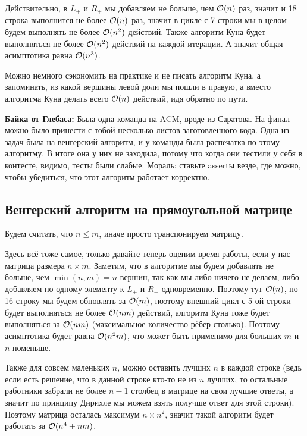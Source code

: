 \documentclass[a4paper, 12pt]{article}
\begin{document}
Действительно, в $L_+$ и $R_+$ мы добавляем не больше, чем $\mathcal{O}(n)$ раз, значит
и 18 строка выполнится не более $\mathcal{O}(n)$ раз, значит в цикле с 7 строки мы
в целом будем выполнять не более $\mathcal{O}(n^2)$ действий. Также
алгоритм Куна будет выполняться не более $\mathcal{O}(n^2)$ действий на каждой итерации.
А значит общая асимптотика равна $\mathcal{O}(n^3)$.

Можно немного сэкономить на практике
и не писать алгоритм Куна, а запоминать, из какой
вершины левой доли мы пошли в правую, а вместо алгоритма Куна делать всего
$\mathcal{O}(n)$ действий, идя обратно по пути.

{\bf Байка от Глебаса:} Была одна команда на ACM, вроде из Саратова. На финал
можно было принести с тобой несколько листов заготовленного кода.
Одна из задач была на венгерский алгоритм, и у команды была распечатка по этому алгоритму.
В итоге она у них не заходила, потому что когда они тестили у себя в контесте,
видимо, тесты были слабые. Мораль: ставьте assertы везде, где можно, чтобы
убедиться, что этот алгоритм работает корректно.

\subsection{Венгерский алгоритм на прямоугольной матрице}

Будем считать, что $n \leqslant m$, иначе просто транспонируем матрицу.

Здесь всё тоже самое, только давайте теперь оценим время работы, если у нас
матрица размера $n \times m$. Заметим, что в алгоритме мы будем добавлять не больше,
чем $\min(n, m) = n$ вершин, так как мы либо ничего не делаем, либо добавляем по
одному элементу к $L_+$ и $R_+$ одновременно. Поэтому тут $\mathcal{O}(n)$, но 16 строку
мы будем обновлять за $\mathcal{O}(m)$, поэтому внешний цикл с 5-ой строки будет
выполняться не более $\mathcal{O}(nm)$ действий, алгоритм Куна тоже будет выполняться
за $\mathcal{O}(nm)$ (максимальное количество рёбер столько). Поэтому асимптотика будет
равна $\mathcal{O}(n^2m)$, что может быть применимо для больших $m$ и
$n$ поменьше.

Также для совсем маленьких $n$, можно оставить лучших $n$ в каждой строке (ведь
если есть решение, что в данной строке кто-то не из $n$ лучших, то остальные
работники забрали не более $n - 1$ столбец в матрице на свои лучшие ответы, а значит
по принципу Дирихле мы можем взять получше ответ для этой строки). Поэтому матрица
осталась максимум $n \times n^2$, значит такой алгоритм будет работать за $\mathcal{O}(n^4 + nm)$.
\end{document}
